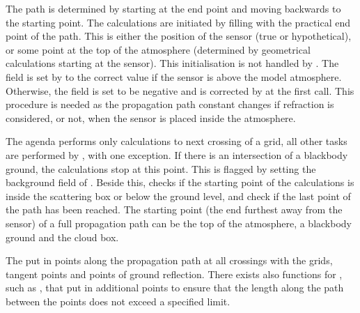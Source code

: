 The path is determined by starting at the end point and moving
backwards to the starting point. The calculations are initiated by
filling  with the practical end point of the
path. This is either the position of the sensor (true or
hypothetical), or some point at the top of the atmosphere (determined
by geometrical calculations starting at the sensor). This
initialisation is not handled by . 
The field  is set by 
to the correct value if the sensor is above the model atmosphere.
Otherwise, the field is set to be negative and is corrected by
 at the first call. This procedure is
needed as the propagation path constant changes if refraction is
considered, or not, when the sensor is placed inside the atmosphere.

The agenda performs only calculations to next crossing of a grid, all
other tasks are performed by , with one exception.
If there is an intersection of a blackbody ground, the calculations
stop at this point. This is flagged by setting the background field of
. Beside this,  checks
if the starting point of the calculations is inside the scattering box
or below the ground level, and check if the last point of the path has
been reached. The starting point (the end furthest away from the
sensor) of a full propagation path can be the top of the atmosphere, a
blackbody ground and the cloud box.

The  put in points along the
propagation path at all crossings with the grids, tangent points and
points of ground reflection. There exists also functions for
, such as
, that put in additional
points to ensure that the length along the path between the points
does not exceed a specified limit.



\label{sec:ppath:Ppath}

